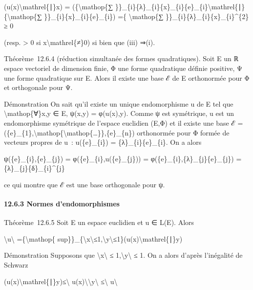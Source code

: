 \documentclass[]{article}
\begin{document}
(u(x)\textbackslash{}mathrel\{∣\}x) = (\{\textbackslash{}mathop\{∑
\}\}\_\{i\}\{λ\}\_\{i\}\{x\}\_\{i\}\{e\}\_\{i\}\textbackslash{}mathrel\{∣\}\{\textbackslash{}mathop\{∑
\}\}\_\{i\}\{x\}\_\{i\}\{e\}\_\{i\}) =\{ \textbackslash{}mathop\{∑
\}\}\_\{i\}\{λ\}\_\{i\}\{x\}\_\{i\}\^{}\{2\} ≥ 0

(resp. \textgreater{} 0 si x\textbackslash{}mathrel\{≠\}0) si bien que
(iii) ⇒(i).

Théorème~12.6.4 (réduction simultanée des formes quadratiques). Soit E
un ℝ espace vectoriel de dimension finie, Φ une forme quadratique
définie positive, Ψ une forme quadratique sur E. Alors il existe une
base ℰ de E orthonormée pour Φ et orthogonale pour Ψ.

Démonstration On sait qu'il existe un unique endomorphisme u de E tel
que \textbackslash{}mathop\{∀\}x,y ∈ E, ψ(x,y) = φ(u(x),y). Comme ψ est
symétrique, u est un endomorphisme symétrique de l'espace euclidien
(E,Φ) et il existe une base ℰ =
(\{e\}\_\{1\},\textbackslash{}mathop\{\textbackslash{}mathop\{\ldots{}\}\},\{e\}\_\{n\})
orthonormée pour Φ formée de vecteurs propres de u~: u(\{e\}\_\{i\}) =
\{λ\}\_\{i\}\{e\}\_\{i\}. On a alors

ψ(\{e\}\_\{i\},\{e\}\_\{j\}) = φ(\{e\}\_\{i\},u(\{e\}\_\{j\})) =
φ(\{e\}\_\{i\},\{λ\}\_\{j\}\{e\}\_\{j\}) =
\{λ\}\_\{j\}\{δ\}\_\{i\}\^{}\{j\}

ce qui montre que ℰ est une base orthogonale pour ψ.

\paragraph{12.6.3 Normes d'endomorphismes}

Théorème~12.6.5 Soit E un espace euclidien et u ∈ L(E). Alors

\textbackslash{}\textbar{}u\textbackslash{}\textbar{}
=\{\textbackslash{}mathop\{
sup\}\}\_\{\textbackslash{}\textbar{}x\textbackslash{}\textbar{}≤1,\textbackslash{}\textbar{}y\textbackslash{}\textbar{}≤1\}\textbar{}(u(x)\textbackslash{}mathrel\{∣\}y)\textbar{}

Démonstration Supposons que
\textbackslash{}\textbar{}x\textbackslash{}\textbar{} ≤
1,\textbackslash{}\textbar{}y\textbackslash{}\textbar{} ≤ 1. On a alors
d'après l'inégalité de Schwarz

\textbar{}(u(x)\textbackslash{}mathrel\{∣\}y)\textbar{}≤\textbackslash{}\textbar{}
u(x)\textbackslash{}\textbar{}\textbackslash{}\textbar{}y\textbackslash{}\textbar{}
≤\textbackslash{}\textbar{} u\textbackslash{}\textbar{}
\end{document}
